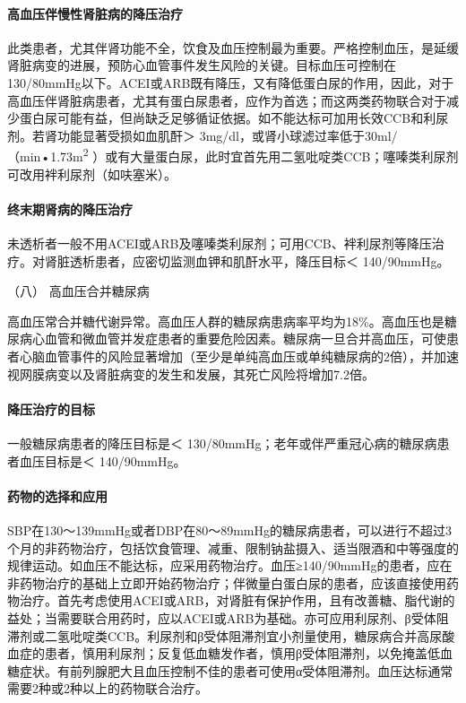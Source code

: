\paragraph{高血压伴慢性肾脏病的降压治疗}

此类患者，尤其伴肾功能不全，饮食及血压控制最为重要。严格控制血压，是延缓肾脏病变的进展，预防心血管事件发生风险的关键。目标血压可控制在130/80mmHg以下。ACEI或ARB既有降压，又有降低蛋白尿的作用，因此，对于高血压伴肾脏病患者，尤其有蛋白尿患者，应作为首选；而这两类药物联合对于减少蛋白尿可能有益，但尚缺乏足够循证依据。如不能达标可加用长效CCB和利尿剂。若肾功能显著受损如血肌酐＞
3mg/dl，或肾小球滤过率低于30ml/（min•1.73m\textsuperscript{2}
）或有大量蛋白尿，此时宜首先用二氢吡啶类CCB；噻嗪类利尿剂可改用袢利尿剂（如呋塞米）。

\paragraph{终末期肾病的降压治疗}

未透析者一般不用ACEI或ARB及噻嗪类利尿剂；可用CCB、袢利尿剂等降压治疗。对肾脏透析患者，应密切监测血钾和肌酐水平，降压目标＜
140/90mmHg。

\hypertarget{text00409.htmlux5cux23CHP17-3-1-8-8}{}
（八） 高血压合并糖尿病

高血压常合并糖代谢异常。高血压人群的糖尿病患病率平均为18\%。高血压也是糖尿病心血管和微血管并发症患者的重要危险因素。糖尿病一旦合并高血压，可使患者心脑血管事件的风险显著增加（至少是单纯高血压或单纯糖尿病的2倍），并加速视网膜病变以及肾脏病变的发生和发展，其死亡风险将增加7.2倍。

\paragraph{降压治疗的目标}

一般糖尿病患者的降压目标是＜
130/80mmHg；老年或伴严重冠心病的糖尿病患者血压目标是＜ 140/90mmHg。

\paragraph{药物的选择和应用}

SBP在130～139mmHg或者DBP在80～89mmHg的糖尿病患者，可以进行不超过3个月的非药物治疗，包括饮食管理、减重、限制钠盐摄入、适当限酒和中等强度的规律运动。如血压不能达标，应采用药物治疗。血压≥140/90mmHg的患者，应在非药物治疗的基础上立即开始药物治疗；伴微量白蛋白尿的患者，应该直接使用药物治疗。首先考虑使用ACEI或ARB，对肾脏有保护作用，且有改善糖、脂代谢的益处；当需要联合用药时，应以ACEI或ARB为基础。亦可应用利尿剂、β受体阻滞剂或二氢吡啶类CCB。利尿剂和β受体阻滞剂宜小剂量使用，糖尿病合并高尿酸血症的患者，慎用利尿剂；反复低血糖发作者，慎用β受体阻滞剂，以免掩盖低血糖症状。有前列腺肥大且血压控制不佳的患者可使用α受体阻滞剂。血压达标通常需要2种或2种以上的药物联合治疗。

